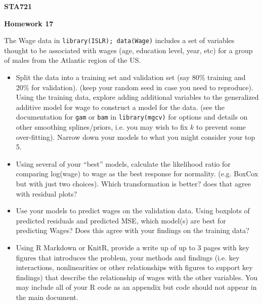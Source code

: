 \documentclass[12pt]{article}
\begin{document}
{\bf STA721}
\vspace{.1in}
\begin{center}
{\large \bf Homework 17} \\
\end{center}

The Wage data in {\tt library(ISLR); data(Wage)} includes a set of
variables thought to be associated with wages  (age, education level,
year, etc) for a group of males from the Atlantic region of the US. 

\begin{itemize}
\item Split the data into a training set and validation set (say 80\%
  training and 20\% for validation).  (keep your random seed in case
  you need to reproduce).   Using
  the training data, explore adding additional variables to the 
  generalized additive model for wage to construct a model for the
  data.  (see the documentation for {\tt gam} or {\tt bam} in
 {\tt library(mgcv)} for options and details on other smoothing
  splines/priors, i.e.  you may wish to fix $k$ to prevent some
  over-fitting). Narrow down your models to what you might consider
  your top 5.   
\item Using several of your ``best'' models, calculate the likelihood
  ratio for comparing log(wage) to wage as the best response for
  normality.  (e.g. BoxCox but with just two choices).  Which
  transformation is better?  does that agree with residual plots?

\item Use your models to predict wages on the validation data.  Using
  boxplots of predicted residuals and predicted MSE, which model(s)
  are best for predicting Wages?  Does this agree with your findings
  on the training data?  

\item Using R Markdown or KnitR, provide a write up of up to 3 pages
  with key figures that introduces the problem, your methods and findings
  (i.e. key interactions, nonlinearities or other relationships with figures to
  support key findings) that describe the relationship of wages with
  the other variables.  You may   include all of your R code as an appendix but
  code should not appear in the main document.
\end{itemize}
\end{document}
